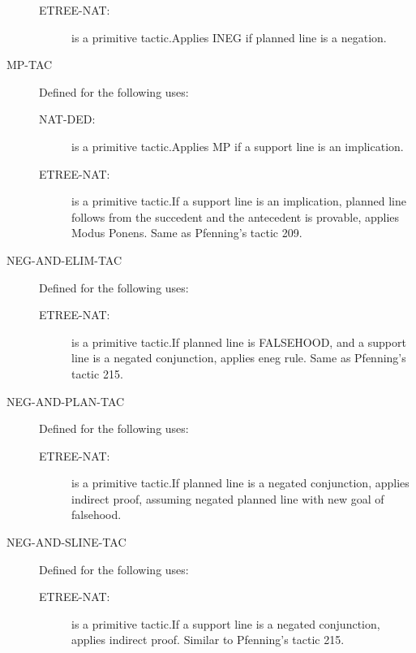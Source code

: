 \begin{description}
\begin{description}
\item[ETREE-NAT:]  is a primitive tactic.Applies INEG if planned line is a negation.

\end{description}

\item[MP-TAC]  Defined for the following uses:
\begin{description}
\item[NAT-DED:]  is a primitive tactic.Applies MP if a support line is an implication.

\item[ETREE-NAT:]  is a primitive tactic.If a support line is an implication, planned line follows from the
succedent and the antecedent is provable, applies Modus Ponens.  Same
as Pfenning's tactic 209.

\end{description}

\item[NEG-AND-ELIM-TAC]  Defined for the following uses:
\begin{description}
\item[ETREE-NAT:]  is a primitive tactic.If planned line is FALSEHOOD, and a support line is a negated conjunction,
applies eneg rule.  Same as Pfenning's tactic 215.

\end{description}

\item[NEG-AND-PLAN-TAC]  Defined for the following uses:
\begin{description}
\item[ETREE-NAT:]  is a primitive tactic.If planned line is a negated conjunction, applies indirect proof,
assuming negated planned line with new goal of falsehood.

\end{description}

\item[NEG-AND-SLINE-TAC]  Defined for the following uses:
\begin{description}
\item[ETREE-NAT:]  is a primitive tactic.If a support line is a negated conjunction, applies indirect proof.
Similar to Pfenning's tactic 215.

\end{description}


\end{description}
